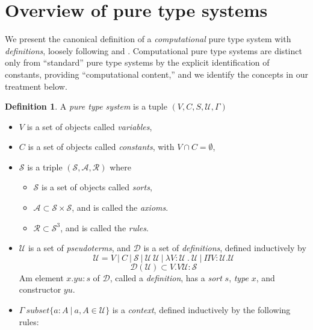 \documentclass{amsbook}
\DeclareRobustCommand{\#}{\adjustbox{valign=B,totalheight=.57\baselineskip}{\oldhash}}%
\theoremstyle{definition}
\newtheorem{definition}[theorem]{Definition}
\theoremstyle{remark}
\numberwithin{section}{chapter}
\numberwithin{equation}{chapter}
\begin{document}
\section{Overview of pure type systems}

We present the canonical definition of a \emph{computational} pure type system with \emph{definitions}, loosely following \cite{ClassicalPTS97} and \cite{PTSWithDefinitions}. Computational pure type systems are distinct only from ``standard'' pure type systems by the explicit identification of constants, providing ``computational content,'' and we identify the concepts in our treatment below.

\begin{definition}
    A \emph{pure type system} is a tuple $(V,C,S,\mathcal{U},\Gamma)$
    \begin{itemize}
        \item $V$ is a set of objects called \emph{variables},
        \item $C$ is a set of objects called \emph{constants}, with $V \cap C = \emptyset$, 
        \item $\mathcal{S}$ is a triple $(\mathcal{S},\mathcal{A},\mathcal{R})$ where
        \begin{itemize}
            \item $\mathcal{S}$ is a set of objects called \emph{sorts},
            \item $\mathcal{A} \subset \mathcal{S}\times\mathcal{S}$, and is called the \emph{axioms}.
            \item $\mathcal{R} \subset \mathcal{S}^3$, and is called the \emph{rules}.
        \end{itemize}
        \item $\mathcal{U}$ is a set of \emph{pseudoterms}, and $\mathcal{D}$ is a set of \emph{definitions}, defined inductively by 
            \begin{equation*}
                \mathcal{U} = V\ |\ C\ |\ \mathcal{S}\ |\ \mathcal{U}\ \mathcal{U}\ |\ \lambda V : \mathcal{U}\ .\ \mathcal{U}\ |\ \Pi V : \mathcal{U} .\mathcal{U}
            \end{equation*}
            \begin{equation*}
                \mathcal{D}(\mathcal{U}) \subset V . V \mathcal{U} : \mathcal{S}
            \end{equation*}
        Am element $x . y u : s$ of $\mathcal{D}$, called a \emph{definition}, has a \emph{sort} $s$, \emph{type} $x$, and constructor $y u$. 
        \item $\Gamma \ subset \{a : A\ |\ a,A \in \mathcal{U}\}$ is a \emph{context}, defined inductively by the following rules:

\end{itemize}
\end{definition}
\end{document}
